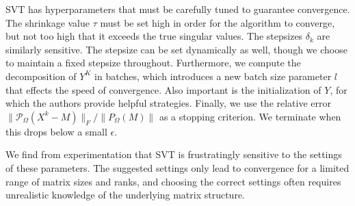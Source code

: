 SVT has hyperparameters that must be carefully tuned to guarantee
convergence. The shrinkage value $\tau$ must be set high in order for
the algorithm to converge, but not too high that it exceeds the true
singular values. The stepsizes $\delta_k$ are similarly sensitive. The
stepsize can be set dynamically as well, though we choose to maintain
a fixed stepsize throughout. Furthermore, we compute the decomposition
of $Y^K$ in batches, which introduces a new batch size parameter $l$
that effects the speed of convergence. Also important is the
initialization of $Y$, for which the authors provide helpful
strategies. Finally, we use the relative error
$\|\mathcal{P}_{\Omega}(X^k-M)\|_F / \|P_{\Omega} (M)\|$ as a stopping
criterion. We terminate when this drops below a small $\epsilon$.

We find from experimentation that SVT is frustratingly sensitive to
the settings of these parameters. The suggested settings only lead to
convergence for a limited range of matrix sizes and ranks, and
choosing the correct settings often requires unrealistic knowledge of
the underlying matrix structure.
